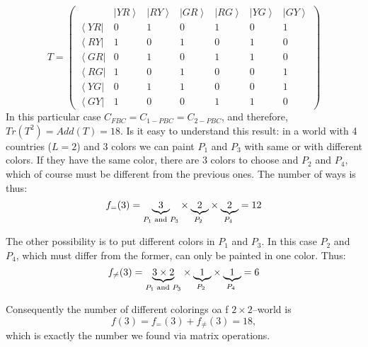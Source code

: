 \documentclass[3p, 10pt, onecolumn]{elsarticle}
\begin{document}
\begin{equation}
T=\left( 
\begin{array}{ccccccc}
& \left\vert YR\right\rangle & \left\vert RY\right\rangle & \left\vert
GR\right\rangle & \left\vert RG\right\rangle & \left\vert YG\right\rangle & 
\left\vert GY\right\rangle \\ 
\left\langle YR\right\vert & 0 & 1 & 0 & 1 & 0 & 1 \\ 
\left\langle RY\right\vert & 1 & 0 & 1 & 0 & 1 & 0 \\ 
\left\langle GR\right\vert & 0 & 1 & 0 & 1 & 1 & 0 \\ 
\left\langle RG\right\vert & 1 & 0 & 1 & 0 & 0 & 1 \\ 
\left\langle YG\right\vert & 0 & 1 & 1 & 0 & 0 & 1 \\ 
\left\langle GY\right\vert & 1 & 0 & 0 & 1 & 1 & 0%
\end{array}%
\right)  \label{Eq:Matrix_L=2}
\end{equation}
\noindent In this particular case $C_{FBC}=C_{1-PBC}=C_{2-PBC}$, and
therefore, $Tr(T^{2})=Add(T)=18$. Is it easy to understand this result: in a
world with 4 countries ($L=2$) and 3 colors we can paint $P_{1}$ and $P_{3}$
with same or with different colors. If they have the same color, there are 3
colors to choose and $P_{2}$ and $P_{4}$, which of course must be different
from the previous ones. The number of ways is thus: 
\begin{equation}
f_{=}(3)=\underset{P_{1}\text{ and }P_{3}}{\underbrace{3}}\times \underset{%
P_{2}\text{ }}{\underbrace{2}}\times \underset{P_{4}\text{ }}{\underbrace{2}}%
=12
\end{equation}

The other possibility is to put different colors in $P_{1}$ and $P_{3}$. In
this case $P_{2}$ and $P_{4}$, which must differ from the former, can only
be painted in one color. Thus: 
\begin{equation}
f_{\neq }(3)=\underset{P_{1}\text{ and }P_{3}}{\underbrace{3\times 2}}\times 
\underset{P_{2}\text{ }}{\underbrace{1}}\times \underset{P_{4}\text{ }}{%
\underbrace{1}}=6
\end{equation}

Consequently the number of different colorings oa f $2\times2$--world is 
\begin{equation}
f(3)=f_{=}(3)+f_{\neq }(3)=18,
\end{equation}%
which is exactly the number we found via matrix operations.
\end{document}
